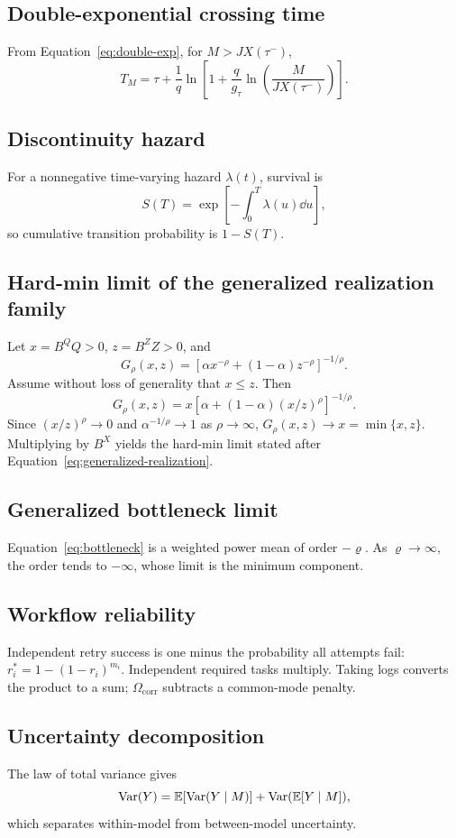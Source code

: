\subsection{Double-exponential crossing time}

From Equation~\eqref{eq:double-exp}, for $M>JX(\tau^-)$,
\[
T_M=\tau+\frac1q\ln\left[1+\frac q{g_\tau}\ln\left(\frac{M}{JX(\tau^-)}\right)\right].
\]

\subsection{Discontinuity hazard}

For a nonnegative time-varying hazard $\lambda(t)$, survival is
\[
S(T)=\exp\left[-\int_0^T\lambda(u)\dd u\right],
\]
so cumulative transition probability is $1-S(T)$.


\subsection{Hard-min limit of the generalized realization family}

Let $x=B^Q Q>0$, $z=B^Z Z>0$, and
\[
G_\rho(x,z)=\left[\alpha x^{-\rho}+(1-\alpha)z^{-\rho}\right]^{-1/\rho}.
\]
Assume without loss of generality that $x\le z$. Then
\[
G_\rho(x,z)=x\left[\alpha+(1-\alpha)(x/z)^\rho\right]^{-1/\rho}.
\]
Since $(x/z)^\rho\to0$ and $\alpha^{-1/\rho}\to1$ as $\rho\to\infty$, $G_\rho(x,z)\to x=\min\{x,z\}$. Multiplying by $B^X$ yields the hard-min limit stated after Equation~\eqref{eq:generalized-realization}.

\subsection{Generalized bottleneck limit}

Equation~\eqref{eq:bottleneck} is a weighted power mean of order $-\varrho$. As $\varrho\to\infty$, the order tends to $-\infty$, whose limit is the minimum component.

\subsection{Workflow reliability}

Independent retry success is one minus the probability all attempts fail: $r_i^*=1-(1-r_i)^{m_i}$. Independent required tasks multiply. Taking logs converts the product to a sum; $\Omega_{\mathrm{corr}}$ subtracts a common-mode penalty.

\subsection{Uncertainty decomposition}

The law of total variance gives
\[
\operatorname{Var}(Y)=\mathbb{E}[\operatorname{Var}(Y\mid M)]+\operatorname{Var}(\mathbb{E}[Y\mid M]),
\]
which separates within-model from between-model uncertainty.
